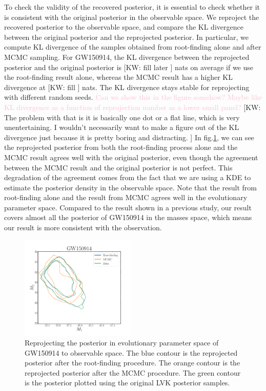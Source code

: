 \documentclass[twocolumn]{aastex631}
\newcommand{\kw}[1]{{\color{rb4}[KW: #1 ]}}
\newcommand{\kb}[1]{\textcolor{pink}{#1}}
\begin{document}
To check the validity of the recovered posterior, it is essential to check whether it is consistent with the original posterior in the observable space.
We reproject the recovered posterior to the observable space, and compare the KL divergence between the original posterior and the reprojected posterior.
In particular, we compute KL divergence of the samples obtained from root-finding alone and after MCMC sampling.
For GW150914, the KL divergence between the reprojected posterior and the original posterior is \kw{fill later} nats on average if we use the root-finding result alone,
whereas the MCMC result has a higher KL divergence at \kw{fill} nats.
The KL divergence stays stable for reprojecting with different random seeds. 
\kb{Can we show this in the figure somehow? Maybe like KL divergence as a function of reprojection number as a lower small panel?}
\kw{The problem with that is it is basically one dot or a flat line, which is very unentertaining. I wouldn't necessarily want to make a figure out of the KL divergence just because it is pretty boring and distracting.}
In fig.\ref{fig:GW150914_reprojection}, we can see the reprojected posterior from both the root-finding process alone and the MCMC result agrees well with the original posterior,
even though the agreement between the MCMC result and the original posterior is not perfect. 
This degradation of the agreement comes from the fact that we are using a KDE to estimate the posterior density in the observable space.
Note that the result from root-finding alone and the result from MCMC agrees well in the evolutionary parameter space.
Compared to the result shown in a previous study, our result covers almost all the posterior of GW150914 in the masses space,
which means our result is more consistent with the observation.


\begin{figure}
\includegraphics[width=0.49\textwidth]{static/GW150914_reprojection.pdf}
\caption{Reprojecting the posterior in evolutionary parameter space of GW150914 to observable space.
The blue contour is the reprojected posterior after the root-finding procedure.
The orange contour is the reprojected posterior after the MCMC procedure.
The green contour is the posterior plotted using the original LVK posterior samples.
}
\label{fig:GW150914_reprojection}
\end{figure}
\end{document}
